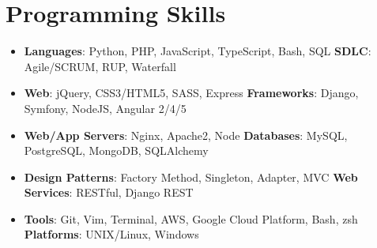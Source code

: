 \documentclass[letterpaper,11pt]{article}
\newcommand{\resumeSubHeadingListStart}{\begin{itemize}[leftmargin=*]}
\newcommand{\resumeSubHeadingListEnd}{\end{itemize}}
\begin{document}
\section{Programming Skills}
 \resumeSubHeadingListStart
   \item{
     \textbf{Languages}{: Python, PHP, JavaScript, TypeScript, Bash, SQL}
     \hfill
     \textbf{SDLC}{: Agile/SCRUM, RUP, Waterfall}
   }
   \item{
     \textbf{Web}{: jQuery, CSS3/HTML5, SASS, Express}
     \hfill
     \textbf{Frameworks}{: Django, Symfony, NodeJS, Angular 2/4/5}
   }
   \item{
     \textbf{Web/App Servers}{: Nginx, Apache2, Node}
     \hfill
     \textbf{Databases}{: MySQL, PostgreSQL, MongoDB, SQLAlchemy}
   }
   \item{
     \textbf{Design Patterns}{: Factory Method, Singleton, Adapter, MVC}
     \hfill
     \textbf{Web Services}{: RESTful, Django REST}
   }
   \item{
     \textbf{Tools}{: Git, Vim, Terminal, AWS, Google Cloud Platform, Bash, zsh}
     \hfill
     \textbf{Platforms}{: UNIX/Linux, Windows}
   }
 \resumeSubHeadingListEnd


\end{document}
